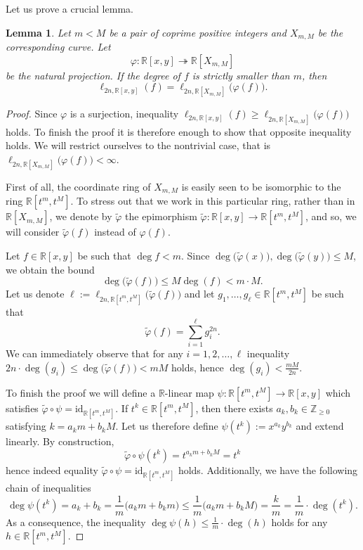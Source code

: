 \documentclass[12pt,reqno]{amsart}   	%
\newtheorem{lemma}[thm]{Lemma}
\theoremstyle{remark}
\newcommand{\Z}{\mathbb{Z}}
\newcommand{\R}{\mathbb{R}}
\begin{document}
Let us prove a crucial lemma.
\begin{lemma} \label{LEM: zachowywanie długości przy przejściu z R^2 na R[X_m,M]}
Let $m<M$ be a pair of coprime positive integers and $X_{m,M}$ be the corresponding curve.  Let  $$\varphi: \R[x,y] \twoheadrightarrow \R[X_{m,M}]$$ be the natural projection. If the degree of $f$ is strictly smaller than $m$, then
    $$
    \ell_{2n, \R[x,y]} (f) = \ell_{2n,\R[X_{m,M}]}\big(\varphi(f)\big).
    $$
   
\end{lemma}
\begin{proof}
    Since $\varphi$ is a surjection, inequality $\ell_{2n, \R[x,y]} (f) \geq \ell_{2n,\R[X_{m,M}]}\big(\varphi(f)\big)$ holds. To finish the proof it is therefore enough to show that opposite inequality holds. We will restrict ourselves to the nontrivial case, that is $\ell_{2n,\R[X_{m,M}]}\big(\varphi(f)\big) < \infty$.

   
First of all, the coordinate ring of $X_{m,M}$ is easily seen to be isomorphic to the ring $\R[t^m,t^M]$. To stress out that we work in this particular ring, rather than in $\R[X_{m,M}]$, we denote by $\widetilde{\varphi}$ the epimorphism $\widetilde{\varphi}: \R[x,y] \rightarrow \R[t^m,t^M]$, and so, we will consider $\widetilde{\varphi}(f)$ instead of $\varphi(f)$.

    
Let $f \in \R[x,y]$ be such that $\deg f <m$. Since $\deg\big(\widetilde{\varphi}(x)\big), \deg\big(\widetilde{\varphi}(y)\big) \leq M$, we obtain the bound 
    $$
    \deg\big(
    \widetilde{\varphi}(f)
    \big) \leq M \deg(f) < m\cdot M.
    $$
    Let us denote $\ell := \ell_{2n,\R[t^m,t^M]}
    \big(
    \widetilde{\varphi}(f)
    \big)$ and let $g_1,\ldots,g_\ell \in \R[t^m,t^M]$ be such that
    $$
     \widetilde{\varphi}(f) = \sum_{i=1}^\ell g_i^{2n}.
    $$
    We can immediately observe that for any $i =1,2,\dots,\ell$ inequality $2n \cdot \deg(g_i) \leq \deg\big(
    \widetilde{\varphi}(f)
    \big) < m M$ holds, hence $\deg(g_i) < \frac{mM}{2n}$. 
    
    To finish the proof we will define a $\R$-linear map $\psi: \R[t^m,t^M] \rightarrow \R[x,y]$ which satisfies $\widetilde{\varphi} \circ \psi = \mathrm{id}_{\R[t^m,t^M]}$. If $t^k \in \R[t^m,t^M]$, then there exists $a_k,b_k \in \Z_{\geq 0}$ satisfying $k = a_k m + b_k M$. Let us therefore define $\psi(t^k) := x^{a_k} y^{b_k}$ and extend linearly. By construction,  $$\widetilde{\varphi} \circ \psi(t^k) = t^{a_k m + b_k M} = t^k$$ hence indeed equality $\widetilde{\varphi} \circ \psi = \mathrm{id}_{\R[t^m,t^M]}$ holds. Additionally, we have the following chain of inequalities
    $$
    \deg \psi(t^k) = a_k + b_k = \frac{1}{m} \big( a_k m + b_k m\big) \leq \frac{1}{m} \big(a_km +  b_kM\big) = \frac{k}{m} = \frac{1}{m} \cdot \deg(t^k).
    $$
    As a consequence, the inequality $\deg \psi(h) \leq \frac{1}{m} \cdot \deg(h)$ holds for any $h \in \R[t^m,t^M]$.


\end{proof}
\end{document}
